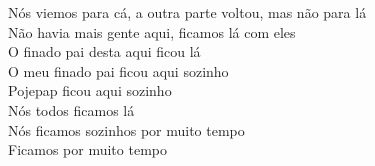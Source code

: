 \begin{linenumbers}\begingroup\raggedright
 
\noindent   Nós viemos para cá, a outra parte voltou, mas não para lá\\
  Não havia mais gente aqui, ficamos lá com eles\\
  O finado pai desta aqui ficou lá\\
  O meu finado pai ficou aqui sozinho\\
  Pojepap ficou aqui sozinho\\
  Nós todos ficamos lá\\
  Nós ficamos sozinhos por muito tempo\\
  Ficamos por muito tempo

\end{linenumbers}\endgroup

\bigskip

